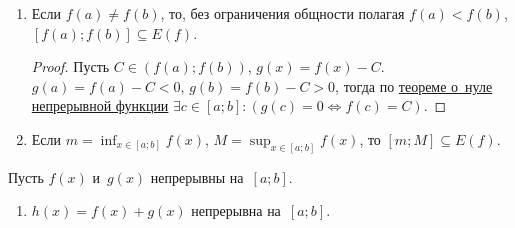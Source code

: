 \begin{enumerate}
	\item \begin{theorem}
	Если $f(a) \neq f(b)$, то, без ограничения общности полагая $f(a) < f(b)$, $[f(a); f(b)] \subseteq E(f)$.
	\end{theorem}
	\begin{proof}
	Пусть $C \in (f(a); f(b))$, $g(x) = f(x) - C$.
	$g(a) = f(a) - C < 0$, $g(b) = f(b) - C > 0$, тогда по \hyperref[th:zero_of_continuous_function]{теореме о~нуле непрерывной функции} $\exists c \in [a; b] \colon (g(c) = 0 \Leftrightarrow f(c) = C)$.
	\end{proof}
	
	\item Если $\displaystyle m = \inf_{x \in [a; b]} f(x)$, $\displaystyle M = \sup_{x \in [a; b]} f(x)$, то $[m; M] \subseteq E(f)$.
\end{enumerate}

Пусть $f(x)$ и~$g(x)$ непрерывны на~$[a; b]$.
\begin{enumerate}
	\item $h(x) = f(x) + g(x)$ непрерывна на~$[a; b]$.
\end{enumerate}